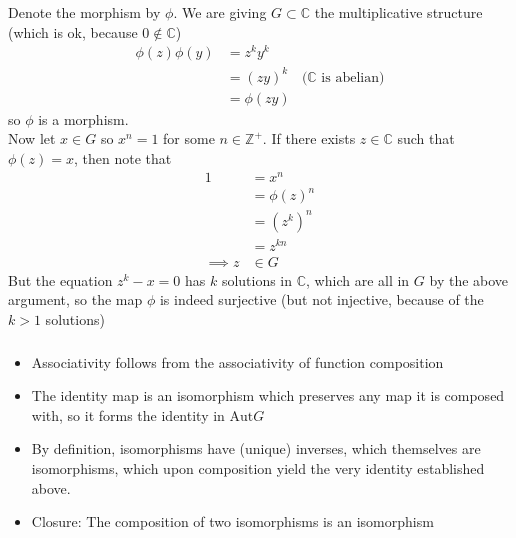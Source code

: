 \documentclass{article}
\newcommand{\ints}{\mathbb{Z}}
\newcommand{\comps}{\mathbb{C}}
\newcommand{\Aut}{ \mbox{Aut} }
\begin{document}
\subsubsection{}\label{ex6p19}
Denote the morphism by $\phi$. We are giving $G \subset \comps$ the multiplicative structure (which is ok, because $0 \notin \comps$)
\begin{align*}
\phi(z)\phi(y) &= z^ky^k\\
&= (zy)^k & \mbox{($\comps$ is abelian)}\\
&= \phi(zy)
\end{align*}
so $\phi$ is a morphism.\\
Now let $x\in G$ so $x^n = 1$ for some $n \in \ints^+$. If there exists $z \in \comps$ such that $\phi(z) = x$, then note that
\begin{align*}
1 &= x^n\\
&= \phi(z)^n\\
&= (z^k)^n\\
&= z^{kn}\\
\implies z &\in G
\end{align*}
But the equation $z^k - x = 0$ has $k$ solutions in $\comps$, which are all in $G$ by the above argument, so the map $\phi$ is indeed surjective (but not injective, because of the $k > 1$ solutions)
\subsubsection{}\label{6p20}
\begin{itemize}
\item Associativity follows from the associativity of function composition
\item The identity map is an isomorphism which preserves any map it is composed with, so it forms the identity in $\Aut G$
\item By definition, isomorphisms have (unique) inverses, which themselves are isomorphisms, which upon composition yield the very identity established above.
\item Closure: The composition of two isomorphisms is an isomorphism
\end{itemize}
\end{document}
